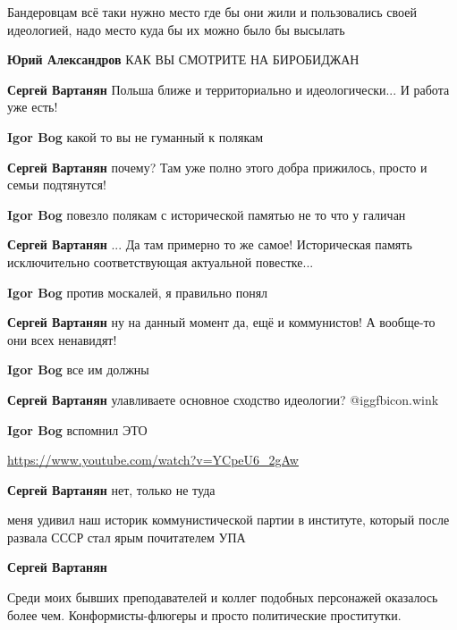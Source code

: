 \begin{itemize}
\begin{itemize}
\end{itemize} %


Бандеровцам всё таки нужно место где бы они жили и пользовались своей
идеологией, надо место куда бы их можно было бы высылать

\begin{itemize} %
\textbf{Юрий Александров} КАК ВЫ СМОТРИТЕ НА БИРОБИДЖАН

\textbf{Сергей Вартанян} Польша ближе и территориально и идеологически... И работа уже есть!

\textbf{Igor Bog} какой то вы не гуманный к полякам

\textbf{Сергей Вартанян} почему? Там уже полно этого добра прижилось, просто и семьи подтянутся!

\textbf{Igor Bog} повезло полякам с исторической памятью не то что у галичан

\textbf{Сергей Вартанян} ... Да там примерно то же самое! Историческая память исключительно соответствующая актуальной повестке...

\textbf{Igor Bog} против москалей, я правильно понял

\textbf{Сергей Вартанян} ну на данный момент да, ещё и коммунистов! А вообще-то они всех ненавидят!

\textbf{Igor Bog} все им должны

\textbf{Сергей Вартанян} улавливаете основное сходство идеологии?  @igg{fbicon.wink} 

\textbf{Igor Bog} вспомнил ЭТО 

\url{https://www.youtube.com/watch?v=YCpeU6_2gAw}

\textbf{Сергей Вартанян} нет, только не туда

\end{itemize} %


меня удивил наш историк коммунистической партии в институте, который после
развала СССР стал ярым почитателем УПА

\textbf{Сергей Вартанян} 

Среди моих бывших преподавателей и коллег подобных персонажей оказалось более
чем. Конформисты-флюгеры и просто политические проститутки.


\end{itemize}
